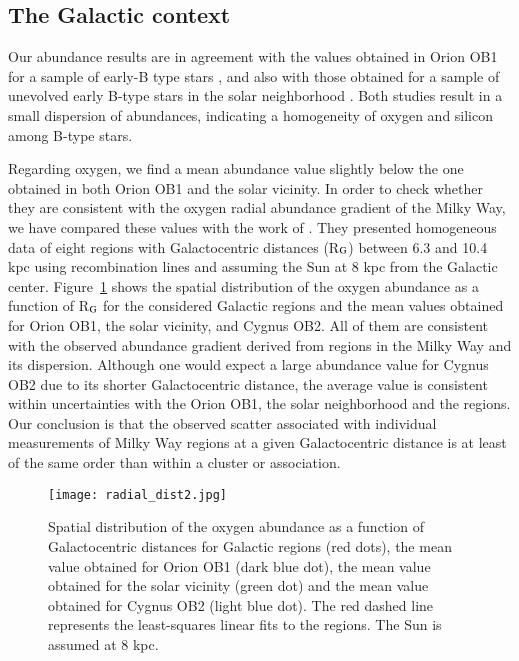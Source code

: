\documentclass{aa} %
\begin{document}
\subsection{The Galactic context}\label{sect411}


Our abundance results are in agreement with the values obtained in Orion OB1 for a sample of early-B type stars \citep{ssimon10}, and also with those obtained for a sample of unevolved early B-type stars in the solar neighborhood \citep{pryzbilla08}. Both studies result in a small dispersion of abundances, indicating a homogeneity of oxygen and silicon among B-type stars. 

Regarding oxygen, we find a mean abundance value slightly below the one obtained in both Orion OB1 and the solar vicinity. In order to check whether they are consistent with the oxygen radial abundance gradient  of the Milky Way, we have compared these values with the work of \cite{esteban05}. They presented homogeneous data of eight  regions with Galactocentric distances (R$_{\rm G}$) between 6.3 and 10.4 kpc using recombination lines and assuming the Sun at 8 kpc from the Galactic center. Figure~\ref{rad_ab_grad} shows the spatial distribution of the oxygen abundance as a function of R$_{\rm G}$ for the considered Galactic  regions and the mean values obtained for Orion OB1, the solar vicinity, and Cygnus OB2.
All of them are consistent with the observed abundance gradient derived from  regions in the Milky Way and its dispersion. Although one would expect a large abundance value for Cygnus OB2 due to its shorter Galactocentric distance, the average value is consistent within uncertainties with the Orion OB1, the solar neighborhood and the  regions. Our conclusion is that the observed scatter associated with individual measurements of Milky Way  regions at a given Galactocentric distance is at least of the same order than within a cluster or association.


\begin{figure}[t!]
\centering 
\texttt{[image: radial\_dist2.jpg]}
\caption{ Spatial distribution of the oxygen abundance as a function of Galactocentric distances for Galactic  regions (red dots), the mean value obtained for  Orion OB1 (dark blue dot), the mean value obtained for the solar vicinity (green dot)  and  the mean value obtained for Cygnus OB2 (light blue dot). The red dashed line represents the least-squares linear fits to the  regions. The Sun is assumed at 8 kpc.}
\label{rad_ab_grad} 
\end{figure}
\end{document}
